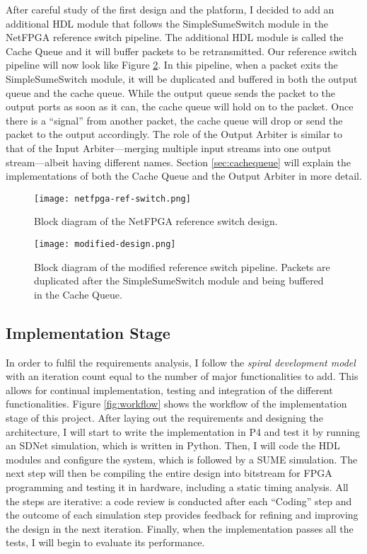 	After careful study of the first design and the platform, I decided to add an additional HDL module that follows the SimpleSumeSwitch module in the NetFPGA reference switch pipeline. The additional HDL module is called the Cache Queue and it will buffer packets to be retransmitted. Our reference switch pipeline will now look like Figure \ref{fig:modified-design}. In this pipeline, when a packet exits the SimpleSumeSwitch module, it will be duplicated and buffered in both the output queue and the cache queue. While the output queue sends the packet to the output ports as soon as it can, the cache queue will hold on to the packet. Once there is a ``signal'' from another packet, the cache queue will drop or send the packet to the output accordingly. The role of the Output Arbiter is similar to that of the Input Arbiter---merging multiple input streams into one output stream---albeit having different names. Section \ref{sec:cachequeue} will explain the implementations of both the Cache Queue and the Output Arbiter in more detail.
	
	\begin{figure}[!ht]
		\centering
		\texttt{[image: netfpga-ref-switch.png]}
		\caption{Block diagram of the NetFPGA reference switch design.}
		\label{fig:netfpga-ref-switch}
	\end{figure}
	
	\begin{figure}[!ht]
		\centering
		\texttt{[image: modified-design.png]}
		\caption{Block diagram of the modified reference switch pipeline. Packets are duplicated after the SimpleSumeSwitch module and being buffered in the Cache Queue.}
		\label{fig:modified-design}
	\end{figure}
		
	\subsection{Implementation Stage}
	
	In order to fulfil the requirements analysis, I follow the \textit{spiral development model} \cite{spiral} with an iteration count equal to the number of major functionalities to add. This allows for continual implementation, testing and integration of the different functionalities. Figure \ref{fig:workflow} shows the workflow of the implementation stage of this project. After laying out the requirements and designing the architecture, I will start to write the implementation in P4 and test it by running an SDNet simulation, which is written in Python. Then, I will code the HDL modules and configure the system, which is followed by a SUME simulation. The next step will then be compiling the entire design into bitstream for FPGA programming and testing it in hardware, including a static timing analysis. All the steps are iterative: a code review is conducted after each ``Coding'' step and the outcome of each simulation step provides feedback for refining and improving the design in the next iteration. Finally, when the implementation passes all the tests, I will begin to evaluate its performance.
			
